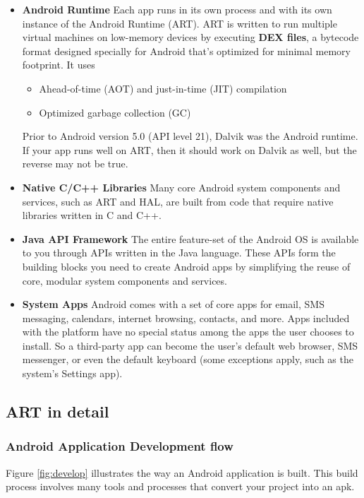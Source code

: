 \begin{itemize}
	\item \textbf{Android Runtime} Each app runs in its own process and with its own instance of the Android Runtime (ART).
		ART is written to run multiple virtual machines on low-memory devices by executing \textbf{DEX files}, a bytecode format designed specially for Android that's optimized for minimal memory footprint.
		It uses
		\begin{itemize}
			\item Ahead-of-time (AOT) and just-in-time (JIT) compilation \cite{}
			\item Optimized garbage collection (GC)
		\end{itemize}
		Prior to Android version 5.0 (API level 21), Dalvik was the Android runtime.
		If your app runs well on ART, then it should work on Dalvik as well, but the reverse may not be true.
		
	\item \textbf{Native C/C++ Libraries} Many core Android system components and services, such as ART and HAL, are built from code that require native libraries written in C and C++.
	
	\item \textbf{Java API Framework} The entire feature-set of the Android OS is available to you through APIs written in the Java language.
		These APIs form the building blocks you need to create Android apps by simplifying the reuse of core, modular system components and services.
		
	\item \textbf{System Apps} Android comes with a set of core apps for email, SMS messaging, calendars, internet browsing, contacts, and more.
		Apps included with the platform have no special status among the apps the user chooses to install.
		So a third-party app can become the user's default web browser, SMS messenger, or even the default keyboard (some exceptions apply, such as the system's Settings app).
\end{itemize}

\subsection{ART in detail}
\subsubsection{Android Application Development flow}
Figure \ref{fig:develop} illustrates the way an Android application is built.
This build process involves many tools and processes that convert your project into an \gls{apk}.

